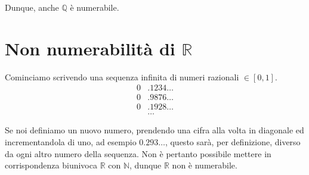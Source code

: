 \documentclass[../../dimostrazioni]{subfiles}
\begin{document}
            Dunque, anche \(\mathbb{Q}\) è numerabile.

        \newpage

        \section*{Non numerabilità di \(\mathbb{R}\)}

            Cominciamo scrivendo una sequenza infinita di numeri razionali \(\in [0, 1]\).
            \begin{align*}
                0&.1234\dots\\
                0&.9876\dots\\
                0&.1928\dots\\
                &\dots
            \end{align*}

            Se noi definiamo un nuovo numero, prendendo una cifra alla volta in diagonale ed incrementandola di uno,
            ad esempio \(0.293\dots\), questo sarà, per definizione, diverso da ogni altro numero della sequenza.
            Non è pertanto possibile mettere in corrispondenza biunivoca \(\mathbb{R}\) con \(\mathbb{N}\), dunque \(\mathbb{R}\)
            non è numerabile.
\end{document}
